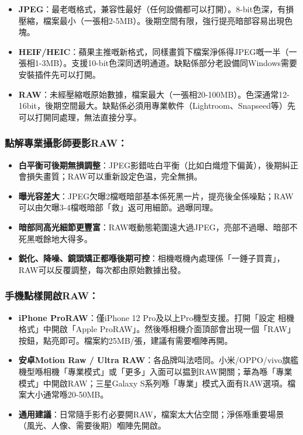 \begin{itemize}
  \item \textbf{JPEG}：最老嘅格式，兼容性最好（任何設備都可以打開）。8-bit色深，有損壓縮，檔案最小（一張相2-5MB）。後期空間有限，強行提亮暗部容易出現色塊。
  \item \textbf{HEIF/HEIC}：蘋果主推嘅新格式，同樣畫質下檔案淨係得JPEG嘅一半（一張相1-3MB）。支援10-bit色深同透明通道。缺點係部分老設備同Windows需要安裝插件先可以打開。
  \item \textbf{RAW}：未經壓縮嘅原始數據，檔案最大（一張相20-100MB）。色深通常12-16bit，後期空間最大。缺點係必須用專業軟件（Lightroom、Snapseed等）先可以打開同處理，無法直接分享。
\end{itemize}

\subsubsection*{點解專業攝影師要影RAW：}

\begin{itemize}
  \item \textbf{白平衡可後期無損調整}：JPEG影錯咗白平衡（比如白熾燈下偏黃），後期糾正會損失畫質；RAW可以重新設定色温，完全無損。
  \item \textbf{曝光容差大}：JPEG欠曝2檔嘅暗部基本係死黑一片，提亮後全係噪點；RAW可以由欠曝3-4檔嘅暗部「救」返可用細節。過曝同理。
  \item \textbf{暗部同高光細節更豐富}：RAW嘅動態範圍遠大過JPEG，亮部不過曝、暗部不死黑嘅餘地大得多。
  \item \textbf{鋭化、降噪、鏡頭矯正都喺後期可控}：相機嘅機內處理係「一錘子買賣」，RAW可以反覆調整，每次都由原始數據出發。
\end{itemize}

\subsubsection*{手機點樣開啟RAW：}

\begin{itemize}
  \item \textbf{iPhone ProRAW}：僅iPhone 12 Pro及以上Pro機型支援。打開「設定 相機 格式」中開啟「Apple ProRAW」。然後喺相機介面頂部會出現一個「RAW」按鈕，點亮即可。檔案約25MB/張，建議有需要嗰陣再開。
  \item \textbf{安卓Motion Raw / Ultra RAW}：各品牌叫法唔同。小米/OPPO/vivo旗艦機型喺相機「專業模式」或「更多」入面可以揾到RAW開關；華為喺「專業模式」中開啟RAW；三星Galaxy S系列喺「專業」模式入面有RAW選項。檔案大小通常喺20-50MB。
  \item \textbf{通用建議}：日常隨手影冇必要開RAW，檔案太大佔空間；淨係喺重要場景（風光、人像、需要後期）嗰陣先開啟。
\end{itemize}

